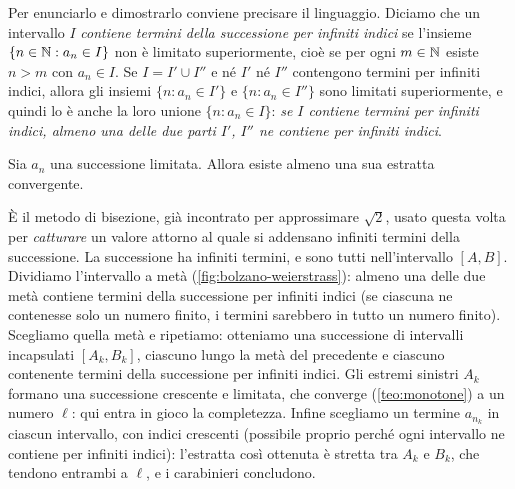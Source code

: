 Per enunciarlo e dimostrarlo conviene precisare il linguaggio. Diciamo che un intervallo
$I$ \emph{contiene termini della successione per infiniti indici} se l'insieme
$\{n\in\mathbb{N} : a_{n}\in I\}$ non è limitato superiormente, cioè se per ogni $m\in\mathbb{N}$ esiste
$n>m$ con $a_{n}\in I$. Se $I=I'\cup I''$ e né $I'$ né $I''$ contengono termini per
infiniti indici, allora gli insiemi $\{n : a_{n}\in I'\}$ e $\{n : a_{n}\in I''\}$ sono
limitati superiormente, e quindi lo è anche la loro unione $\{n : a_{n}\in I\}$:
\emph{se $I$ contiene termini per infiniti indici, almeno una delle due parti $I'$, $I''$
ne contiene per infiniti indici}.

\begin{teorema}\label{teo:bolzano-weierstrass}
Sia $a_{n}$ una successione limitata. Allora esiste almeno una sua estratta convergente.
\end{teorema}

\begin{schema}
\end{schema}

\begin{strategia}
È il metodo di bisezione, già incontrato per approssimare $\sqrt2$, usato questa volta per
\emph{catturare} un valore attorno al quale si addensano infiniti termini della
successione. La successione ha infiniti termini, e sono
tutti nell'intervallo $[A,B]$. Dividiamo l'intervallo a metà (\cref{fig:bolzano-weierstrass}): almeno una delle due metà
contiene termini della successione per infiniti indici (se ciascuna ne contenesse solo un
numero finito, i termini sarebbero in tutto un numero finito). Scegliamo quella metà e
ripetiamo: otteniamo una successione di intervalli incapsulati $[A_{k},B_{k}]$, ciascuno
lungo la metà del precedente e ciascuno contenente termini della successione per infiniti
indici. Gli estremi sinistri $A_{k}$ formano una successione crescente e limitata, che
converge (\cref{teo:monotone}) a un numero $\ell$: qui entra in gioco la completezza.
Infine scegliamo un termine $a_{n_{k}}$ in ciascun intervallo, con indici crescenti
(possibile proprio perché ogni intervallo ne contiene per infiniti indici): l'estratta
così ottenuta è stretta tra $A_{k}$ e $B_{k}$, che tendono entrambi a $\ell$, e i
carabinieri concludono.
\end{strategia}

